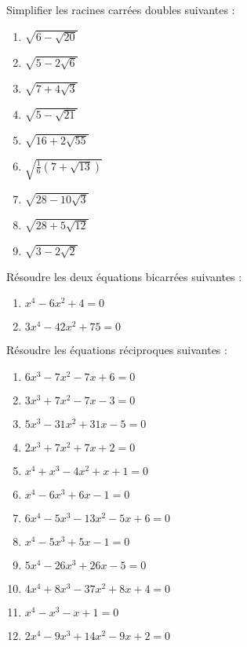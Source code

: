 \begin{exercice}
Simplifier les racines carrées doubles suivantes :
\begin{multicols}{2}
\begin{enumerate}
\item $\sqrt{6-\sqrt{20}}$
\item $\sqrt{5-2\sqrt{6}}$
\item $\sqrt{7+4\sqrt{3}}$
\item $\sqrt{5-\sqrt{21}}$
\item $\sqrt{16+2\sqrt{55}}$
\item $\sqrt{\frac{1}{6}\left( 7+\sqrt{13} \right)}$
\item $\sqrt{28-10\sqrt{3}}$
\item $\sqrt{28+5\sqrt{12}}$
\item $\sqrt{3-2\sqrt{2}}$
\end{enumerate}
\end{multicols}
\end{exercice}

\begin{exercice}
Résoudre les deux équations bicarrées suivantes :
\begin{enumerate}
\item ${{x}^{4}}-6{{x}^{2}}+4=0$
\item $3{{x}^{4}}-42{{x}^{2}}+75=0$
\end{enumerate}
\end{exercice}

\begin{exercice}
Résoudre les équations réciproques suivantes :
\begin{multicols}{2}
\begin{enumerate}
\item $6x{}^{3}-7{{x}^{2}}-7x+6=0$
\item $3{{x}^{3}}+7{{x}^{2}}-7x-3=0$
\item $5{{x}^{3}}-31{{x}^{2}}+31x-5=0$
\item $2{{x}^{3}}+7{{x}^{2}}+7x+2=0$
\item ${{x}^{4}}+{{x}^{3}}-4{{x}^{2}}+x+1=0$
\item ${{x}^{4}}-6{{x}^{3}}+6x-1=0$
\item $6{{x}^{4}}-5{{x}^{3}}-13{{x}^{2}}-5x+6=0$
\item ${{x}^{4}}-5{{x}^{3}}+5x-1=0$
\item $5{{x}^{4}}-26{{x}^{3}}+26x-5=0$
\item $4{{x}^{4}}+8{{x}^{3}}-37{{x}^{2}}+8x+4=0$
\item ${{x}^{4}}-{{x}^{3}}-x+1=0$
\item $2{{x}^{4}}-9{{x}^{3}}+14{{x}^{2}}-9x+2=0$
\end{enumerate}
\end{multicols}
\end{exercice}

